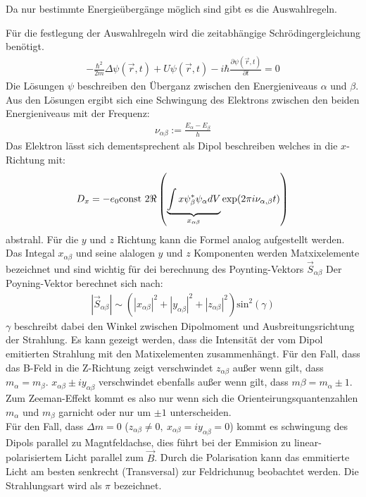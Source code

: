 Da nur bestimmte Energieübergänge möglich sind gibt es die Auswahlregeln.

Für die festlegung der Auswahlregeln wird die zeitabhängige Schrödingergleichung benötigt.
\begin{align}
	-\frac{\hbar^2}{2m}\Delta \psi(\vec{r},t)+U\psi(\vec{r},t)-i\hbar\frac{\partial \psi(\vec{r},t)}{\partial t}=0
\end{align}
Die Lösungen $\psi$ beschreiben den Überganz zwischen den Energieniveaus $\alpha$ und $\beta$.
Aus den Lösungen ergibt sich eine Schwingung des Elektrons zwischen den beiden Energieniveaus mit der Frequenz:
\begin{align*}
  \nu_{\alpha\beta}:=\frac{E_\alpha-E_\beta}{h}
\end{align*}
Das Elektron lässt sich dementsprechent als Dipol beschreiben welches in die $x$-Richtung mit:
\begin{align*}
  	D_x=-e_0\text{const } 2 \Re \real\left( \underbrace{\int x\psi^*_\beta\psi_\alpha dV}_{x_{\alpha\beta}}\exp(2\pi i\nu_{\alpha,\beta}t) \right)
\end{align*}
abstrahl.
Für die $y$ und $z$ Richtung kann die Formel analog aufgestellt werden.
Das Integal $x_{\alpha\beta}$ und seine alalogen $y$ und $z$ Komponenten werden Matxixelemente bezeichnet und sind wichtig für dei berechnung des Poynting-Vektors $\vec{S}_{\alpha\beta}$
Der Poyning-Vektor berechnet sich nach:
\begin{align*}
  |\vec{S}_{\alpha\beta}| \sim \left(|x_{\alpha\beta}|^2+|y_{\alpha\beta}|^2+|z_{\alpha\beta}|^2\right) \text{sin}^2(\gamma)
\end{align*}
$\gamma$ beschreibt dabei den Winkel zwischen Dipolmoment und Ausbreitungsrichtung der Strahlung.
Es kann gezeigt werden, dass die Intensität der vom Dipol emitierten Strahlung mit den Matixelementen zusammenhängt.
Für den Fall, dass das B-Feld in die Z-Richtung zeigt verschwindet $z_{\alpha\beta}$ außer wenn gilt, dass $m_{\alpha} = m_{\beta}$.
$x_{\alpha\beta}\pm i y_{\alpha\beta}$ verschwindet ebenfalls außer wenn gilt, dass $m{\beta} = m_{\alpha} \pm 1$.
Zum Zeeman-Effekt kommt es also nur wenn sich die Orienteirungsquantenzahlen $m_{\alpha}$ und $m_{\beta}$ garnicht oder nur um $\pm 1$ unterscheiden.\\

Für den Fall, dass $\Delta m = 0$ ($z_{\alpha\beta} \neq 0,\ x_{\alpha\beta} = i y_{\alpha\beta} = 0$) kommt es schwingung des Dipols parallel zu Magntfeldachse,
dies führt bei der Emmision zu linear-polarisiertem Licht parallel zum $\vec{B}$.
Durch die Polarisation kann das emmitierte Licht am besten senkrecht (Transversal) zur Feldrichunug beobachtet werden.
Die Strahlungsart wird als $\pi$ bezeichnet.

